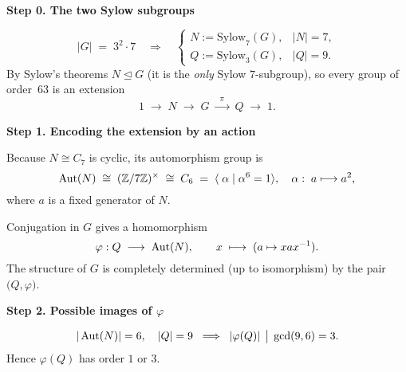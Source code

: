 \documentclass[12pt]{article}
\theoremstyle{definition} %
\theoremstyle{plain} %
\begin{document}
\bigskip
\textbf{Step 0.  The two Sylow subgroups}

\[
   |G| \;=\; 3^{2}\cdot7
   \quad\Longrightarrow\quad
   \begin{cases}
      N := \text{Sylow}_{7}(G), & |N| = 7,\\[3pt]
      Q := \text{Sylow}_{3}(G), & |Q| = 9.
   \end{cases}
\]
By Sylow’s theorems \(N\trianglelefteq G\) (it is the \emph{only}
Sylow \(7\)-subgroup), so every group of order~63 is an extension
\[
   1\;\longrightarrow\;N\;\longrightarrow\;G
     \;\xrightarrow{\;\;\pi\;\;}\;Q\;\longrightarrow\;1.
\]

\bigskip
\textbf{Step 1.  Encoding the extension by an action}

Because \(N\cong C_{7}\) is cyclic, its automorphism group is
\[
   \operatorname{Aut}(N)\;\cong\;(\mathbb{Z}/7\mathbb{Z})^{\times}\;\cong\;C_{6}
   \;=\;\langle\;\alpha\;|\;\alpha^{6}=1\rangle,
   \quad
   \alpha:\;a\longmapsto a^{2},
\]
where \(a\) is a fixed generator of \(N\).

Conjugation in \(G\) gives a homomorphism
\[
   \varphi : Q \;\longrightarrow\; \operatorname{Aut}(N),\qquad
   x \;\longmapsto\;(a\mapsto xax^{-1}).
\]
The structure of \(G\) is completely determined (up to isomorphism)
by the pair \(\bigl(Q,\varphi\bigr)\).

\bigskip
\textbf{Step 2.  Possible images of \(\varphi\)}

\[
   |\operatorname{Aut}(N)| = 6,\quad |Q| = 9
   \;\;\Longrightarrow\;\;
   |\varphi(Q)| \,\bigm|\,\gcd(9,6) = 3.
\]
Hence \(\varphi(Q)\) has order \(1\) or \(3\).
\end{document}
